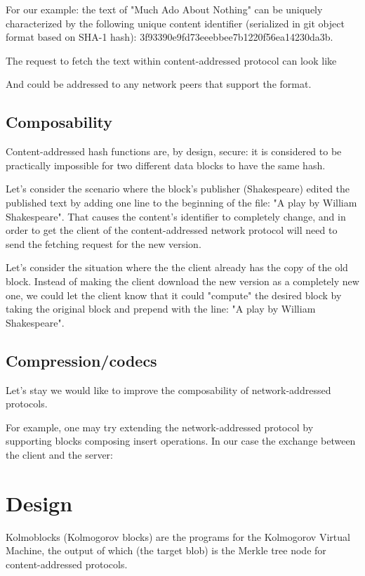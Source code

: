 \documentclass[twocolumn,aps,pra,floatfix]{revtex4-1}
\begin{document}
For our example: the text of "Much Ado About Nothing" can be uniquely characterized by the following unique content identifier (serialized in git object format based on SHA-1 hash): 3f93390e9fd73eeebbee7b1220f56ea14230da3b.

The request to fetch the text within content-addressed protocol can look like 

And could be addressed to any network peers that support the format.

\subsection{Composability}
Content-addressed hash functions are, by design, secure: it is considered to be practically impossible  for two different data blocks to have the same hash. 

Let's consider the scenario where the block's publisher (Shakespeare) edited the published text by adding one line to the beginning of the file: "A play by William Shakespeare". 
That causes the content's identifier to completely change, and in order to get the client of the content-addressed network protocol will need to send the fetching request for the new version. 

Let's consider the situation where the the client already has the copy of the old block. Instead of making the client download the new version as a completely new one, we could let the client know that it could "compute" the desired block by taking the original block and prepend with the line: "A play by William Shakespeare". 

\subsection{Compression/codecs}
Let's stay we would like to improve the composability of network-addressed protocols. 

For example, one may try extending the network-addressed protocol by supporting blocks composing insert operations. In our case the exchange between the client and the server:
 

\section{Design}
Kolmoblocks (Kolmogorov blocks) are the programs for the Kolmogorov Virtual Machine, the output of which (the target blob) is the Merkle tree node for content-addressed protocols.  
\end{document}

